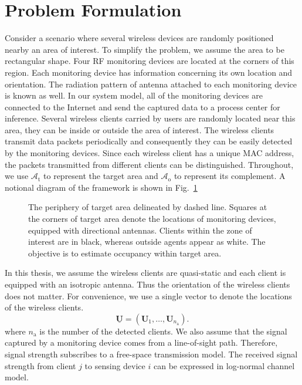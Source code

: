 \section{Problem Formulation}
Consider a scenario where several wireless devices are randomly positioned nearby an area of interest. To simplify the problem, we assume the area to be rectangular shape.
Four RF monitoring devices are located at the corners of this region.
Each monitoring device has information concerning its own location and orientation.
The radiation pattern of antenna attached to each monitoring device is known as well.
In our system model, all of the monitoring devices are connected to the Internet and send the captured data to a process center for inference.
Several wireless clients carried by users are randomly located near this area, they can be inside or outside the area of interest.
The wireless clients transmit data packets periodically and consequently they can be easily detected by the monitoring devices.
Since each wireless client has a unique MAC address, the packets transmitted from different clients can be distinguished.
Throughout, we use $\mathcal{A}_{\mathrm{t}}$ to represent the target area and $\mathcal{A}_{\mathrm{o}}$ to represent its complement. A notional diagram of the framework is shown in Fig.~\ref{figure:NotionalDiagram}
\begin{figure}[t]
\centerline{}
\caption{The periphery of target area delineated by dashed line. 
Squares at the corners of target area denote the locations of monitoring devices, equipped with directional antennas.
Clients within the zone of interest are in black, whereas outside agents appear as white.
The objective is to estimate occupancy within target area.}
\label{figure:NotionalDiagram}
\end{figure}
In this thesis, we assume the wireless clients are quasi-static and each client is equipped with an isotropic antenna.
Thus the orientation of the wireless clients does not matter.
For convenience, we use a single vector to denote the locations of the wireless clients.
\begin{equation}
\underline{\mathbf{U}} = (\mathbf{U}_1, \ldots, \mathbf{U}_{n_{\mathrm{a}}}).
\end{equation}
where $n_{\mathrm{a}}$ is the number of the detected clients.
We also assume that the signal captured by a monitoring device comes from a line-of-sight path.
Therefore, signal strength subscribes to a free-space transmission model.
The received signal strength from client $j$ to sensing device $i$ can be expressed in log-normal channel model.

